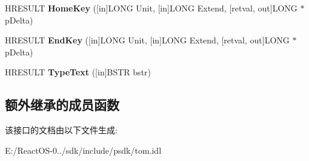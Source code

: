 \begin{DoxyCompactItemize}
\item 
\mbox{\label{interface_i_text_selection_a81619a71d3a8f4fab041cd12360f41d6}} 
H\+R\+E\+S\+U\+LT {\bfseries Home\+Key} (\mbox{[}in\mbox{]}L\+O\+NG Unit, \mbox{[}in\mbox{]}L\+O\+NG Extend, \mbox{[}retval, out\mbox{]}L\+O\+NG $\ast$p\+Delta)
\item 
\mbox{\label{interface_i_text_selection_a3441dc7227b1419f5a375aaaf64360a4}} 
H\+R\+E\+S\+U\+LT {\bfseries End\+Key} (\mbox{[}in\mbox{]}L\+O\+NG Unit, \mbox{[}in\mbox{]}L\+O\+NG Extend, \mbox{[}retval, out\mbox{]}L\+O\+NG $\ast$p\+Delta)
\item 
\mbox{\label{interface_i_text_selection_a03761e7b7f978bab9144a9618f154e25}} 
H\+R\+E\+S\+U\+LT {\bfseries Type\+Text} (\mbox{[}in\mbox{]}B\+S\+TR bstr)
\end{DoxyCompactItemize}
\subsection*{额外继承的成员函数}


该接口的文档由以下文件生成\+:\begin{DoxyCompactItemize}
\item 
E\+:/\+React\+O\+S-\/0../sdk/include/psdk/tom.\+idl\end{DoxyCompactItemize}
